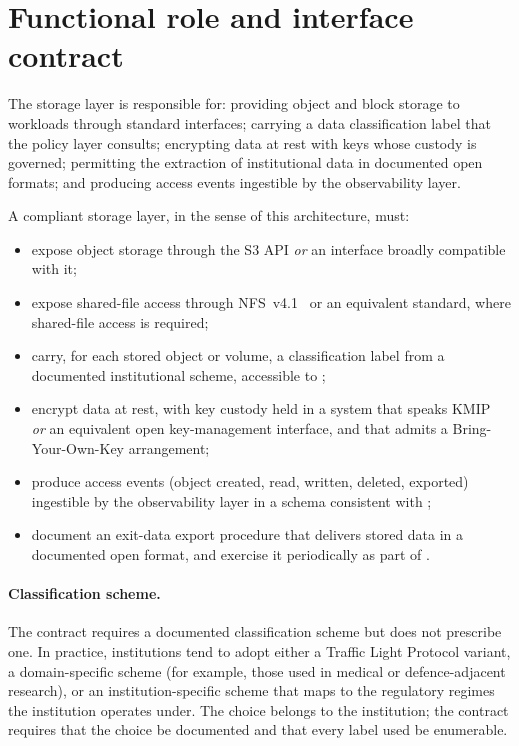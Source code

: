\section{Functional role and interface contract}
\label{sec:st-contract}

The storage layer is responsible for: providing object and block
storage to workloads through standard interfaces; carrying a data
classification label that the policy layer consults; encrypting
data at rest with keys whose custody is governed; permitting the
extraction of institutional data in documented open formats; and
producing access events ingestible by the observability layer.

\begin{contractbox}
\noindent A compliant storage layer, in the sense of this
architecture, must:

\begin{itemize}[leftmargin=1.5em,nosep]
  \item expose object storage through the S3 API \emph{or} an
    interface broadly compatible with it;
  \item expose shared-file access through NFS~v4.1~\cite{rfc-8881-nfs41}
    or an equivalent standard, where shared-file access is required;
  \item carry, for each stored object or volume, a
    classification label from a documented institutional scheme,
    accessible to ;
  \item encrypt data at rest, with key custody held in a system that
    speaks KMIP~\cite{kmip-oasis} \emph{or} an equivalent open
    key-management interface, and that admits a Bring-Your-Own-Key
    arrangement;
  \item produce access events (object created, read, written,
    deleted, exported) ingestible by the observability layer in a
    schema consistent with ;
  \item document an exit-data export procedure that delivers stored
    data in a documented open format, and exercise it periodically
    as part of .
\end{itemize}
\end{contractbox}

\paragraph{Classification scheme.} The contract requires a documented
classification scheme but does not prescribe one. In practice,
institutions tend to adopt either a Traffic Light Protocol variant,
a domain-specific scheme (for example, those used in medical or
defence-adjacent research), or an institution-specific scheme that
maps to the regulatory regimes the institution operates under. The
choice belongs to the institution; the contract requires that the
choice be documented and that every label used be enumerable.

